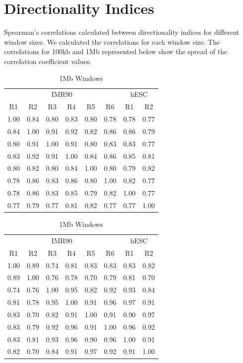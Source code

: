 \newpage
\section*{Directionality Indices}\label{sec:SuppDirectionality}

Spearman's correlations calculated between directionality indices for different window sizes.  We calculated the
correlations for each window size.  The correlations for 100kb and 1Mb represented below show the spread of the
correlation coefficient values.

\begin{table}[H]
  \caption{Directionality Index Correlations}
  \parbox{.45\linewidth}{%
    \centering
    \tiny
    \caption{100kb Windows}\label{tab:SuppDi100kbWindows}
    \begin{tabular}{*{8}{c}}
      \toprule
      \multicolumn{6}{c}{IMR90} & \multicolumn{2}{c}{hESC} \\
      R1 & R2 & R3 & R4 & R5 & R6 & R1 & R2 \\
      \midrule
      1.00 & 0.84 & 0.80 & 0.83 & 0.80 & 0.78 & 0.78 & 0.77 \\
      0.84 & 1.00 & 0.91 & 0.92 & 0.82 & 0.86 & 0.86 & 0.79 \\
      0.80 & 0.91 & 1.00 & 0.91 & 0.80 & 0.83 & 0.83 & 0.77 \\
      0.83 & 0.92 & 0.91 & 1.00 & 0.84 & 0.86 & 0.85 & 0.81 \\
      0.80 & 0.82 & 0.80 & 0.84 & 1.00 & 0.80 & 0.79 & 0.82 \\
      0.78 & 0.86 & 0.83 & 0.86 & 0.80 & 1.00 & 0.82 & 0.77 \\
      0.78 & 0.86 & 0.83 & 0.85 & 0.79 & 0.82 & 1.00 & 0.77 \\
      0.77 & 0.79 & 0.77 & 0.81 & 0.82 & 0.77 & 0.77 & 1.00 \\
      \bottomrule
    \end{tabular}
  }%
  \hfill
  \parbox{.45\linewidth}{%
    \centering
    \tiny
    \caption{1Mb Windows}\label{tab:SuppDi1MBWindows}
    \begin{tabular}{*{8}{c}}
      \toprule
      \multicolumn{6}{c}{IMR90} & \multicolumn{2}{c}{hESC} \\
      R1 & R2 & R3 & R4 & R5 & R6 & R1 & R2 \\
      \midrule
      1.00 & 0.89 & 0.74 & 0.81 & 0.83 & 0.83 & 0.83 & 0.82 \\
      0.89 & 1.00 & 0.76 & 0.78 & 0.70 & 0.79 & 0.81 & 0.70 \\
      0.74 & 0.76 & 1.00 & 0.95 & 0.82 & 0.92 & 0.93 & 0.84 \\
      0.81 & 0.78 & 0.95 & 1.00 & 0.91 & 0.96 & 0.97 & 0.91 \\
      0.83 & 0.70 & 0.82 & 0.91 & 1.00 & 0.91 & 0.90 & 0.97 \\
      0.83 & 0.79 & 0.92 & 0.96 & 0.91 & 1.00 & 0.96 & 0.92 \\
      0.83 & 0.81 & 0.93 & 0.96 & 0.90 & 0.96 & 1.00 & 0.91 \\
      0.82 & 0.70 & 0.84 & 0.91 & 0.97 & 0.92 & 0.91 & 1.00 \\
      \bottomrule
    \end{tabular}
  }
\end{table}

